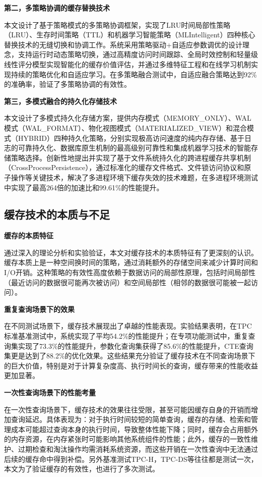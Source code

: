 \textbf{第二，多策略协调的缓存替换技术}

本文设计了基于策略模式的多策略协调框架，实现了LRU时间局部性策略（LRU）、生存时间策略（TTL）和机器学习智能策略（MLIntelligent）四种核心替换技术的无缝切换和协调工作。系统采用策略驱动+自适应参数调优的设计理念，支持运行时动态策略切换，通过高精度访问时间跟踪、全局时效控制和轻量级线性评分模型实现智能化的缓存价值评估，并通过多维特征工程和在线学习机制实现持续的策略优化和自适应学习。在多策略融合测试中，自适应融合策略达到92\%的准确率，验证了多策略协调的有效性。

\textbf{第三，多模式融合的持久化存储技术}

本文设计了多模式持久化存储方案，提供内存模式（MEMORY\_ONLY）、WAL模式（WAL\_FORMAT）、物化视图模式（MATERIALIZED\_VIEW）和混合模式（HYBRID）四种持久化策略，分别实现极高访问速度的纯内存存储、基于日志的可靠持久化、数据库原生机制的最高级别可靠性和集成机器学习技术的智能存储策略选择。创新性地提出并实现了基于文件系统持久化的跨进程缓存共享机制（CrossProcessPersistence），通过标准化的缓存文件格式、文件锁访问协议和原子操作等关键技术，解决了多进程环境下缓存失效的技术难题，在多进程环境测试中实现了最高264倍的加速比和99.61\%的性能提升。

\subsection{缓存技术的本质与不足}

\textbf{缓存的本质特征}

通过深入的理论分析和实验验证，本文对缓存技术的本质特征有了更深刻的认识。缓存本质上是一种空间换时间的策略，通过消耗额外的存储空间来减少计算时间和I/O开销。这种策略的有效性高度依赖于数据访问的局部性原理，包括时间局部性（最近访问的数据很可能再次被访问）和空间局部性（相邻的数据很可能被一起访问）。

\textbf{重复查询场景下的效果}

在不同测试场景下，缓存技术展现出了卓越的性能表现。实验结果表明，在TPC标准基准测试中，系统实现了平均54.2\%的性能提升；在专项功能测试中，重复查询集实现了73.3\%的性能提升，参数化查询集获得了85.6\%的性能提升，CTE查询集更是达到了88.2\%的优化效果。这些结果充分验证了缓存技术在不同查询场景下的巨大价值，特别是对于计算复杂度高、执行时间长的查询，缓存带来的性能收益更加显著。

\textbf{一次性查询场景下的性能考量}

在一次性查询场景下，缓存技术的效果往往受限，甚至可能因缓存自身的开销而增加查询延迟。具体表现为：对于执行时间较短的简单查询，缓存的存储、检索和管理成本可能超过查询本身的执行时间，导致整体性能下降；同时，缓存会占用额外的内存资源，在内存紧张时可能影响其他系统组件的性能；此外，缓存的一致性维护、过期检查和淘汰操作均需消耗系统资源，而这些开销在一次性查询中无法通过后续的缓存命中得到补偿。另外基准测试TPC-H，TPC-DS等往往都是测试一次，本文为了验证缓存的有效性，也进行了多次测试。

